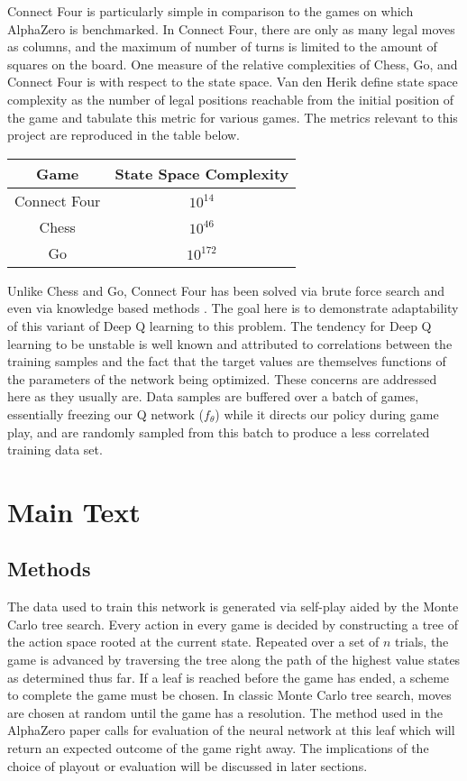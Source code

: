 \documentclass[twoside,11pt]{article}
\begin{document}
Connect Four is particularly simple in comparison to the games on which
AlphaZero is benchmarked. In Connect Four, there are only
as many legal moves as columns, and the maximum of number of turns 
is limited to the amount of squares on the board. 
One measure of the relative complexities of Chess, Go, and Connect Four is with
respect to the state space. Van den Herik \cite{VANDENHERIK2002277}  define state space complexity as the number 
of legal positions reachable from the initial position of the game
and tabulate this metric for various games. The metrics relevant to this project are reproduced in the table
below.

\begin{tabular}{ c c }
        Game & State Space Complexity \\
        \hline
        Connect Four & $10^{14}$ \\
        Chess & $10^{46}$ \\
        Go & $10^{172}$ \\
    \end{tabular}

Unlike Chess and Go, Connect Four has been solved via brute force search \cite{ConnectFourComputer} 
and even via knowledge based methods \cite{ConnectFourKnowledge}. The goal here is to demonstrate
adaptability of this variant of Deep Q learning to this problem. The tendency for Deep Q learning to be unstable is 
well known and attributed to correlations between the training samples and the fact that the target 
values are themselves functions of the parameters of the network being optimized. These concerns 
are addressed here as they usually are. Data samples are buffered over a batch of games, essentially 
freezing our Q network ($f_{\theta}$)
while it directs our policy during game play, and are randomly sampled from this batch to produce a
less correlated training data set.


\section{Main Text}


\subsection{Methods}

The data used to train this network is generated via self-play aided by the Monte Carlo tree search.
Every action in every game is decided by constructing a tree of the action space rooted at 
the current state. Repeated over a set of
$n$ trials, the game is advanced by traversing the tree along the path of the highest
value states as determined thus far. If a leaf is reached before the game has ended, a scheme to complete the game must be chosen.
In classic Monte Carlo tree search, moves are chosen at random until the game has a resolution. 
The method used in the AlphaZero paper calls for evaluation of the neural network at this leaf
which will return an expected outcome of the game right away.
The implications of the choice of playout or evaluation
will be discussed in later sections.
\end{document}
